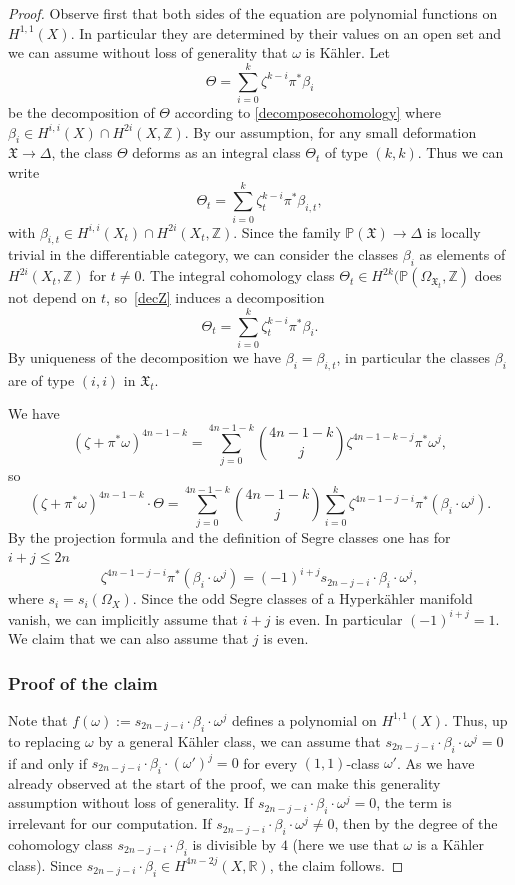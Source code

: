 \documentclass[JEP,XML,SOM,Unicode,NoEqCountersInSection,published]{cedram}
\theoremstyle{plain}
\theoremstyle{definition}
\newcommand{\R}{\ensuremath{\mathbb{R}}}
\newcommand{\Z}{\ensuremath{\mathbb{Z}}}
\newcommand{\PP}{\ensuremath{\mathbb{P}}}
\begin{document}
\begin{proof}
Observe first that both sides of the equation are polynomial functions on $H^{1,1}(X)$.
In particular they are determined by their values on an open set and we can assume
without loss of generality that $\omega$ is Kähler.
Let
\begin{equation} \label{decZ}
\Theta=\sum_{i=0}^{k} \zeta^{k-i} \pi^* \beta_{i}
\end{equation}
be the decomposition of $\Theta$ according to \eqref{decomposecohomology}
where $\beta_{i} \in H^{i,i} (X) \cap H^{2i}(X, \Z)$.
By our assumption, for any small deformation $\mathfrak X \to \Delta$, the class $\Theta$ deforms
as an integral class $\Theta_t$ of type $(k,k)$. Thus we can write
\[
\Theta_t=\sum_{i=0}^{k} \zeta_t^{k-i} \pi^* \beta_{i,t},
\]
with $\beta_{i,t} \in H^{i,i} (X_t) \cap H^{2i}(X_t, \Z)$. Since the family $\PP(\mathfrak X) \to \Delta$
is locally trivial in the differentiable category, we can consider the classes $\beta_{i}$ as elements of
$H^{2i}(X_t, \Z)$ for $t \neq 0$. The integral cohomology class $\Theta_t \in H^{2k}(\PP(\Omega_{\mathfrak X_t}, \Z)$ does not depend on $t$, so~\eqref{decZ} induces a decomposition
\[
\Theta_t=\sum_{i=0}^{k} \zeta_t^{k-i} \pi^* \beta_{i}.
\]
By uniqueness of the decomposition we have $\beta_i = \beta_{i,t}$, in particular the classes
$\beta_{i}$ are of type $(i,i)$ in $\mathfrak X_t$.

We have
\[
(\zeta+\pi^*\omega)^{4n-1-k}
=
\sum_{j=0}^{4n-1-k} \binom{4n-1-k}{j} \zeta^{4n-1-k-j} \pi^* \omega^j,
\]
so
\[
(\zeta+\pi^*\omega)^{4n-1-k} \cdot \Theta
=
\sum_{j=0}^{4n-1-k}
\binom{4n-1-k}{j}
\sum_{i=0}^{k} \zeta^{4n-1-j-i} \pi^* (\beta_{i} \cdot \omega^j)
.
\]
By the projection formula and the definition of Segre classes one has for $i+j \leq 2n$
\[
\zeta^{4n-1-j-i} \pi^* (\beta_{i} \cdot \omega^j)
=
(-1)^{i+j} s_{2n-j-i} \cdot \beta_{i} \cdot \omega^j,
\]
where $s_i=s_i(\Omega_X)$.
Since the odd Segre classes of a Hyperkähler manifold vanish, we can implicitly assume that
$i+j$ is even. In particular $(-1)^{i+j}=1$.
We claim that we can also assume that $j$ is even.

\subsubsection*{Proof of the claim}
Note that $f(\omega):=s_{2n-j-i} \cdot \beta_{i} \cdot \omega^j$ defines a polynomial on $H^{1,1}(X)$.
Thus, up to replacing $\omega$ by a general Kähler class, we can assume that $s_{2n-j-i} \cdot \beta_{i} \cdot \omega^j = 0$
if and only if $s_{2n-j-i} \cdot \beta_{i} \cdot (\omega')^j = 0$ for every $(1,1)$-class $\omega'$. As we have already observed at the start of the proof, we can make this generality assumption without loss of generality.
If $s_{2n-j-i} \cdot \beta_{i} \cdot \omega^j = 0$, the term is irrelevant for our computation.
If $s_{2n-j-i} \cdot \beta_{i} \cdot \omega^j \neq 0$,
then by \cite[Th.\,2.1]{Ver96} the degree of the cohomology class $s_{2n-j-i} \cdot \beta_{i}$ is divisible by $4$ (here we use that $\omega$ is a Kähler class).
Since $s_{2n-j-i} \cdot \beta_{i} \in H^{4n-2j}(X, \R)$, the claim follows.


\end{proof}
\end{document}
